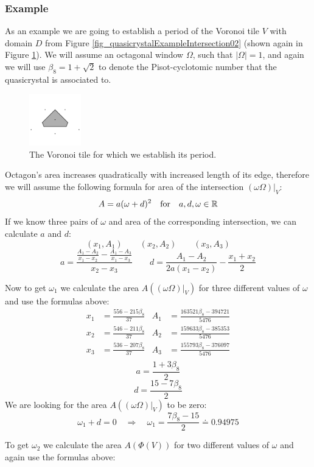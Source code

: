 \documentclass[text.tex]{subfiles}
\begin{document}
\subsubsection{Example}
As an example we are going to establish a period of the Voronoi tile $V$ with domain $D$ from Figure \ref{fig_quasicrystalExampleIntersection02} (shown again in Figure \ref{fig_example2D_tile}). We will assume an octagonal window $\Omega$, such that $|\Omega| = 1$, and again we will use $\beta_8 = 1+\sqrt{2}$ to denote the Pisot-cyclotomic number that the quasicrystal is associated to. 

\begin{figure}[h!]
\centering
\includegraphics[width=0.2\textwidth]{img/2D/intersectionTile03}
\caption{The Voronoi tile for which we establish its period. }
\label{fig_example2D_tile}
\end{figure}

Octagon's area increases quadratically with increased length of its edge, therefore we will assume the following formula for area of the intersection $(\omega\Omega)|_V$: 
$$A = a(\omega+d)^2 \quad\text{for}\quad a,d,\omega\in\mathbb{R}$$
If we know three pairs of $\omega$ and area of the corresponding intersection, we can calculate $a$ and $d$:
$$(x_1,A_1) \qquad (x_2,A_2) \qquad (x_3,A_3)$$
$$a = \frac{\frac{A_1-A_2}{x_1-x_2}-\frac{A_1-A_3}{x_1-x_3}}{x_2-x_3} \qquad d=\frac{A_1-A_2}{2a(x_1-x_2)}-\frac{x_1+x_2}{2}$$

Now to get $\omega_1$ we calculate the area $A((\omega\Omega)|_V)$ for three different values of $\omega$ and use the formulas above: 
\begin{align*}
x_1&=\frac{556-215\beta_8}{37} & A_1&=\frac{163521\beta_8-394721}{5476} \\
x_2&=\frac{546-211\beta_8}{37} & A_2&=\frac{159633\beta_8-385353}{5476} \\
x_3&=\frac{536-207\beta_8}{37} & A_3&=\frac{155793\beta_8-376097}{5476} \\
\end{align*}
$$a = \frac{1+3\beta_8}{2}$$
$$d = \frac{15-7\beta_8}{2}$$
We are looking for the area $A((\omega\Omega)|_V)$ to be zero:
$$\omega_1+d=0\quad\Rightarrow\quad \omega_1 = \frac{7\beta_8-15}{2}\doteq 0.94975$$

To get $\omega_2$ we calculate the area $A(\Phi(V))$ for two different values of $\omega$ and again use the formulas above: 
\end{document}
